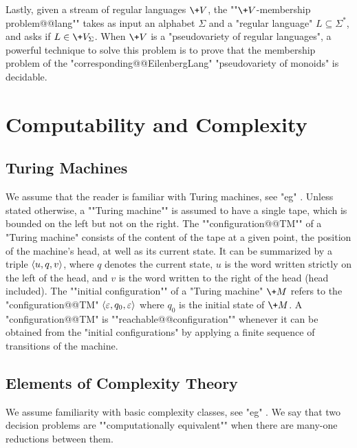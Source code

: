 Lastly, given a stream of regular languages $\+V$, the \AP""$\+V$-membership problem@@lang""
takes as input an alphabet $\Sigma$ and a "regular language" $L \subseteq \Sigma^*$,
and asks if $L \in \+V_{\Sigma}$. When $\+V$ is a "pseudovariety of regular languages",
a powerful technique to solve this problem is to prove that the membership problem
of the "corresponding@@EilenbergLang" "pseudovariety of monoids" is decidable.


\section{Computability and Complexity}

\subsection{Turing Machines}

We assume that the reader is familiar with Turing machines,
see "eg" \cite[\S~1]{AroraBarak2009ComputationalComplexity}.
Unless stated otherwise, a \AP""Turing machine"" is assumed to have a single tape,
which is bounded on the left but not on the right.
The ""configuration@@TM"" of a "Turing machine" consists of
the content of the tape at a given point, the position of the machine's head,
at well as its current state. It can be summarized by
a triple $\langle u, q, v\rangle$, where $q$ denotes the current state,
$u$ is the word written strictly on the left of the head,
and $v$ is the word written to the right of the head (head included).
The \AP""initial configuration"" of a "Turing machine" $\+M$ refers to the "configuration@@TM" 
$\langle\varepsilon, q_0, \varepsilon\rangle$ where $q_0$ is the initial state of $\+M$.
A "configuration@@TM" is \AP""reachable@@configuration"" whenever
it can be obtained from the "initial configurations" by applying a finite sequence
of transitions of the machine.

\subsection{Elements of Complexity Theory}

We assume familiarity with basic complexity classes, see "eg"
\cite[\S\!\S~2--5]{AroraBarak2009ComputationalComplexity}.
We say that two decision problems are \AP""computationally equivalent""
when there are many-one reductions between them.

